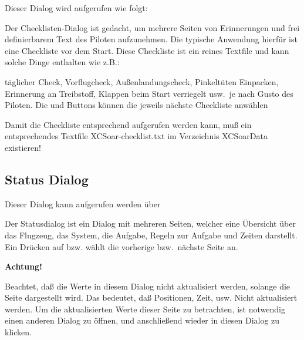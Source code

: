 Dieser Dialog wird aufgerufen wie folgt:
\begin{quote}
\blink{}
\end{quote}

Der Checklisten-Dialog ist gedacht, um mehrere Seiten von Erinnerungen und frei definierbarem Text des Piloten aufzunehmen.
Die typische Anwendung hierfür ist eine Checkliste vor dem Start. Diese Checkliste ist ein reines Textfile und kann solche Dinge enthalten wie z.B.:


täglicher Check, Vorflugcheck, Außenlandungscheck, Pinkeltüten Einpacken, Erinnerung an Treibstoff, Klappen beim Start verriegelt usw.\ je nach Gusto des Piloten.
Die  \button{$<$} und \button{$>$} Buttons  können die jeweils nächste Checkliste anwählen

Damit die Checkliste entsprechend aufgerufen werden kann, muß ein entsprechendes Textfile \textsf{\textsf{XCSoar}-checklist.txt} im Verzeichnis \textsf{\textsf{XCSoar}Data} existieren!

\subsection*{Status Dialog}

Dieser Dialog kann aufgerufen werden über
\begin{quote}
\blink{}\blink{}
\end{quote}

Der Statusdialog ist ein Dialog mit mehreren Seiten, welcher eine Übersicht über das Flugzeug, das System, die Aufgabe, Regeln zur Aufgabe und Zeiten darstellt. Ein Drücken auf \button{$<$} bzw.  \button{$>$} wählt die vorherige bzw.\  nächste Seite an.

\textbf{Achtung!}\blitz

Beachtet, daß die Werte in diesem Dialog nicht aktualisiert werden, solange die Seite dargestellt wird.
Das bedeutet, daß Positionen, Zeit, usw. Nicht aktualisiert werden. Um die aktualisierten Werte dieser Seite zu betrachten, ist notwendig einen anderen Dialog zu öffnen, und anschließend wieder in diesen Dialog zu klicken.

